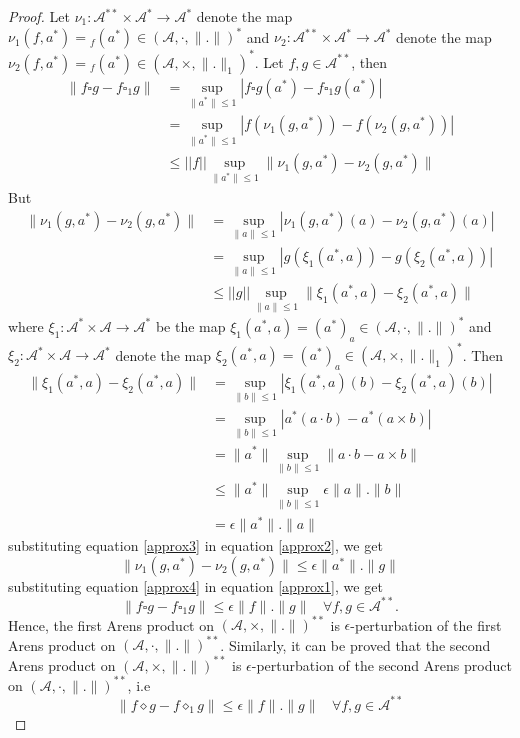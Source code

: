 \documentclass[10pt,a4paper]{amsart}
\begin{document}
 \begin{proof}
 	Let $\nu_1:\mathcal A^{**}\times \mathcal A^*\to \mathcal A^*$ denote the map $\nu_1(f,a^*)={}_f(a^*)\in (\mathcal A, \cdot,\|.\|)^*$ and $\nu_2:\mathcal A^{**}\times \mathcal A^*\to \mathcal A^*$ denote the map $\nu_2(f,a^*)={}_f(a^*)\in (\mathcal A, \times, \|.\|_1)^*$. 
 	Let $f,g\in \mathcal A^{**}$, then
 	\begin{align}\label{approx1}
 		\|f\square g-f\square_1g\|&=\sup_{\|a^*\|\leq 1}|f\square g(a^*)-f\square_1g(a^*)| \nonumber\\&=\sup_{\|a^*\|\leq 1}|f(\nu_1(g,a^*))-f(\nu_2(g,a^*))|\nonumber\\&\leq ||f||\sup_{\|a^*\|\leq 1}\|\nu_1(g,a^*)-\nu_2(g,a^*)\|
 	\end{align}
 	But 
 	\begin{align}\label{approx2}
 	\|\nu_1(g,a^*)-\nu_2(g,a^*)\|&=\sup_{\|a\|\leq 1}|\nu_1(g,a^*)(a)-\nu_2(g,a^*)(a)|\nonumber\\&=\sup_{\|a\|\leq 1}|g(\xi_1(a^*,a))-g(\xi_2(a^*,a))|\nonumber\\&\leq ||g||\sup_{\|a\|\leq 1}\|\xi_1(a^*,a)-\xi_2(a^*,a)\|
 	\end{align}
 	where $\xi_1:\mathcal A^*\times \mathcal A\to \mathcal A^*$ be the map $\xi_1(a^*,a)=(a^*)_a\in (\mathcal A,\cdot, \|.\|)^*$ and $\xi_2:\mathcal A^*\times \mathcal A\to \mathcal A^*$ denote the map $\xi_2(a^*,a)=(a^*)_a\in (\mathcal A, \times ,\|.\|_1)^*$. Then
 	 \begin{align}\label{approx3}
\|\xi_1(a^*,a)-\xi_2(a^*,a)\|&=\sup_{\|b\|\leq 1}|\xi_1(a^*,a)(b)-\xi_2(a^*,a)(b)|\nonumber\\&=\sup_{\|b\|\leq 1}|a^*(a\cdot b)-a^*(a\times b)|\nonumber\\&=\|a^*\|\sup_{\|b\|\leq 1}\|a\cdot b-a\times b\| \nonumber\\&\leq \|a^*\|\sup_{\|b\|\leq 1}\epsilon\|a\|.\|b\|\nonumber\\&=\epsilon\|a^*\|.\|a\|
 	\end{align}
 	substituting equation \ref{approx3} in equation \ref{approx2}, we get \begin{equation}\label{approx4}\|\nu_1(g,a^*)-\nu_2(g,a^*)\|\leq \epsilon\|a^*\|.\|g\|\end{equation}
 	substituting equation \ref{approx4} in equation \ref{approx1}, we get $$	\|f\square g-f\square_1g\|\leq \epsilon \|f\|.\|g\|~~~~\forall f,g\in \mathcal A^{**}.$$
 	Hence, the first Arens product on $(\mathcal A, \times ,\|.\|)^{**}$ is $\epsilon$-perturbation of the first Arens product on $(\mathcal A, \cdot, \|.\|)^{**}$. Similarly, it can be proved that the second Arens product on $(\mathcal A, \times ,\|.\|)^{**}$ is $\epsilon$-perturbation of the second Arens product on $(\mathcal A, \cdot, \|.\|)^{**}$, i.e
 	 $$	\|f\diamond g-f\diamond_1g\|\leq \epsilon \|f\|.\|g\| ~~~~\forall f,g\in \mathcal A^{**}$$
 	 \end{proof}
\end{document}
